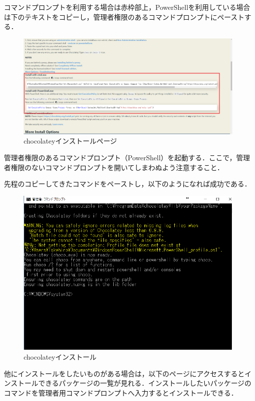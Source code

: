 コマンドプロンプトを利用する場合は赤枠部上，PowerShellを利用している場合は下のテキストをコピーし，管理者権限のあるコマンドプロンプトにペーストする．
\begin{figure}[htb]
\centering
\includegraphics[width=13cm]{4-2.png}
\caption{chocolateyインストールページ}\label{4-2}
\end{figure}
\newpage

管理者権限のあるコマンドプロンプト（PowerShell）を起動する．ここで，管理者権限のないコマンドプロンプトを開いてしまわぬよう注意すること．

先程のコピーしてきたコマンドをペーストし，以下のようになれば成功である．
\begin{figure}[htb]
\centering
\includegraphics[width=13cm]{4-3.png}
\caption{chocolateyインストール}\label{4-3}
\end{figure}
\newpage


他にインストールをしたいものがある場合は，以下のページにアクセスするとインストールできるパッケージの一覧が見れる．インストールしたいパッケージのコマンドを管理者用コマンドプロンプトへ入力するとインストールできる．

